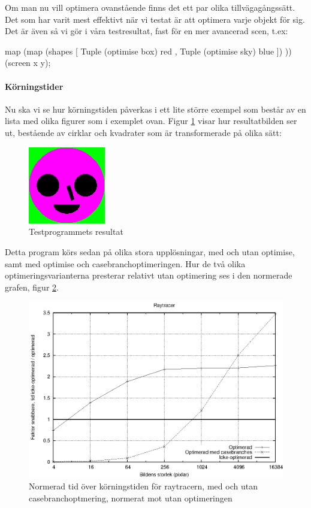 \documentclass[Rapport]{subfiles}
\begin{document}
Om man nu vill optimera ovanstående finns det ett par olika tillvägagångssätt. 
Det som har varit mest effektivt när vi testat är att optimera varje objekt för sig. 
Det är även så vi gör i våra testresultat, fast för en mer avancerad scen, t.ex: 
\begin{codeEx}
map (map (shapes 
             [ Tuple (optimise box) red
             , Tuple (optimise sky) blue 
             ])
         )) (screen x y);
\end{codeEx}


\paragraph{Körningstider}

Nu ska vi se hur körningstiden påverkas i ett lite större exempel som består av
en lista med olika figurer som i exemplet ovan. Figur \ref{fig:Resultat:shapes:bild} visar hur
resultatbilden ser ut, bestående av cirklar och kvadrater som är transformerade på olika sätt:

\begin{figure}[H]
\centering
    \includegraphics[width=0.3\textwidth]{img/shapes.png}
    \caption{Testprogrammets resultat}
    \label{fig:Resultat:shapes:bild}
\end{figure}

Detta program körs sedan på olika stora upplösningar, med och utan optimise,
samt med optimise och casebranchoptimeringen. Hur de två olika
optimeringsvarianterna presterar relativt utan optimering ses i 
den normerade grafen, figur \ref{fig:Resultat:shapes:normgraf}.

\begin{figure}[H]
\includegraphics{shapesnorm.eps}
\caption{Normerad tid över körningstiden för raytracern, med och utan
casebranchoptmering, normerat mot utan optimeringen}
\label{fig:Resultat:shapes:normgraf}
\end{figure}
\end{document}
